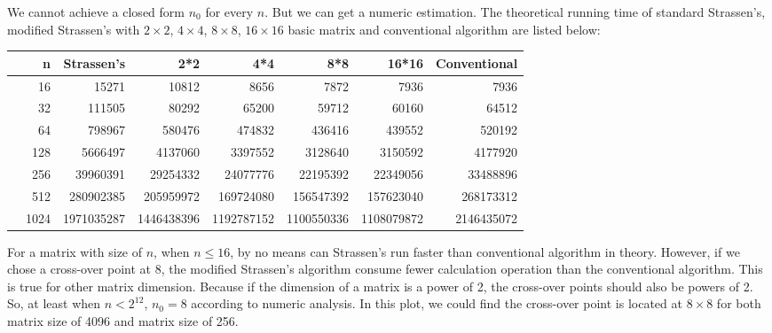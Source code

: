 \documentclass[a4paper, 11pt]{article}
\begin{document}
We cannot achieve a closed form $n_0$ for every $n$. But we can get a numeric estimation. The theoretical running time of standard Strassen's, modified Strassen's with $2\times2$, $4\times4$, $8 \times 8$, $16 \times 16$ basic matrix and conventional algorithm are listed below:
\begin{table}[ht]
	\centering
	\begin{tabular}{rrrrrrrr}
		\hline
		& n & Strassen's & 2*2 & 4*4 & 8*8 & 16*16 & Conventional \\ 
		\hline
		 & 16 & 15271 & 10812 & 8656 &\cellcolor{blue!25} 7872 & 7936 & 7936 \\ 
	 & 32 & 111505 & 80292 & 65200 &\cellcolor{blue!25}  59712 & 60160 & 64512 \\ 
		& 64 & 798967 & 580476 & 474832 &\cellcolor{blue!25}  436416 & 439552 & 520192 \\ 
		 & 128 & 5666497 & 4137060 & 3397552 &\cellcolor{blue!25}  3128640 & 3150592 & 4177920 \\ 
		 & 256 & 39960391 & 29254332 & 24077776 &\cellcolor{blue!25}  22195392 & 22349056 & 33488896 \\ 
		 & 512 & 280902385 & 205959972 & 169724080 &\cellcolor{blue!25}  156547392 & 157623040 & 268173312 \\ 
		 & 1024 & 1971035287 & 1446438396 & 1192787152 &\cellcolor{blue!25}  1100550336 & 1108079872 & 2146435072 \\ 
		\hline
	\end{tabular}
\end{table}
For a matrix with size of $n$, when $n\leq 16$, by no means can Strassen's run faster than conventional algorithm in theory. However, if we chose a cross-over point at 8, the modified Strassen's algorithm consume fewer calculation operation than the conventional algorithm. This is true for other matrix dimension. Because if the dimension of a matrix is a power of 2, the cross-over points should also be powers of 2. So, at least when $n<2^12$, $n_0=8$ according to numeric analysis.
In this plot, we could find the cross-over point is located at $8\times8$ for both matrix size of 4096 and matrix size of 256.
\end{document}
